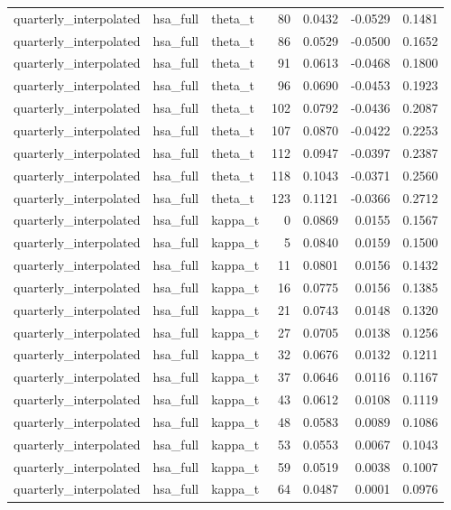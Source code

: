 \begin{tabular}{lllrrrr}
quarterly\_interpolated & hsa\_full & theta\_t & 80 & 0.0432 & -0.0529 & 0.1481 \\
quarterly\_interpolated & hsa\_full & theta\_t & 86 & 0.0529 & -0.0500 & 0.1652 \\
quarterly\_interpolated & hsa\_full & theta\_t & 91 & 0.0613 & -0.0468 & 0.1800 \\
quarterly\_interpolated & hsa\_full & theta\_t & 96 & 0.0690 & -0.0453 & 0.1923 \\
quarterly\_interpolated & hsa\_full & theta\_t & 102 & 0.0792 & -0.0436 & 0.2087 \\
quarterly\_interpolated & hsa\_full & theta\_t & 107 & 0.0870 & -0.0422 & 0.2253 \\
quarterly\_interpolated & hsa\_full & theta\_t & 112 & 0.0947 & -0.0397 & 0.2387 \\
quarterly\_interpolated & hsa\_full & theta\_t & 118 & 0.1043 & -0.0371 & 0.2560 \\
quarterly\_interpolated & hsa\_full & theta\_t & 123 & 0.1121 & -0.0366 & 0.2712 \\
quarterly\_interpolated & hsa\_full & kappa\_t & 0 & 0.0869 & 0.0155 & 0.1567 \\
quarterly\_interpolated & hsa\_full & kappa\_t & 5 & 0.0840 & 0.0159 & 0.1500 \\
quarterly\_interpolated & hsa\_full & kappa\_t & 11 & 0.0801 & 0.0156 & 0.1432 \\
quarterly\_interpolated & hsa\_full & kappa\_t & 16 & 0.0775 & 0.0156 & 0.1385 \\
quarterly\_interpolated & hsa\_full & kappa\_t & 21 & 0.0743 & 0.0148 & 0.1320 \\
quarterly\_interpolated & hsa\_full & kappa\_t & 27 & 0.0705 & 0.0138 & 0.1256 \\
quarterly\_interpolated & hsa\_full & kappa\_t & 32 & 0.0676 & 0.0132 & 0.1211 \\
quarterly\_interpolated & hsa\_full & kappa\_t & 37 & 0.0646 & 0.0116 & 0.1167 \\
quarterly\_interpolated & hsa\_full & kappa\_t & 43 & 0.0612 & 0.0108 & 0.1119 \\
quarterly\_interpolated & hsa\_full & kappa\_t & 48 & 0.0583 & 0.0089 & 0.1086 \\
quarterly\_interpolated & hsa\_full & kappa\_t & 53 & 0.0553 & 0.0067 & 0.1043 \\
quarterly\_interpolated & hsa\_full & kappa\_t & 59 & 0.0519 & 0.0038 & 0.1007 \\
quarterly\_interpolated & hsa\_full & kappa\_t & 64 & 0.0487 & 0.0001 & 0.0976 \\

\end{tabular}
